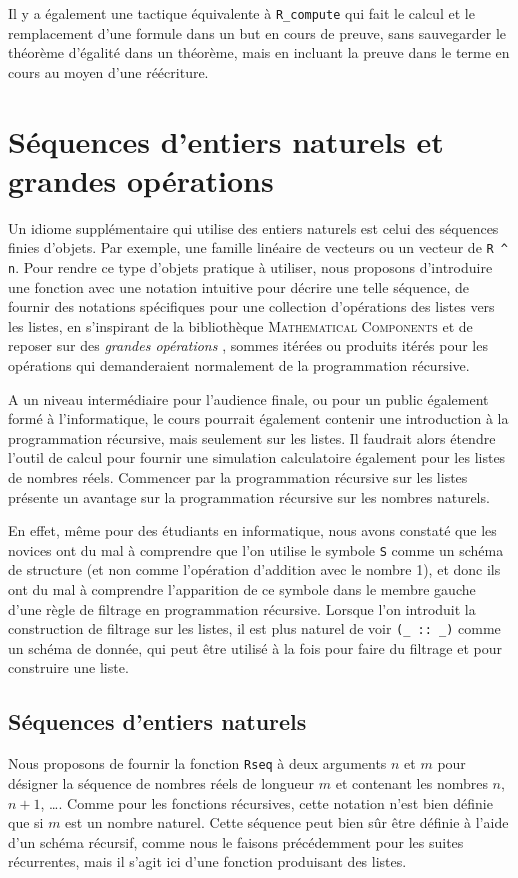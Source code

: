 \documentclass{jflart}
\newcommand{\mathcomp}{\textsc{Mathematical Components}}
\begin{document}
Il y a également une tactique équivalente à \texttt{R\_compute} qui fait
le calcul et le remplacement d'une formule dans un but en cours de
preuve, sans sauvegarder le théorème d'égalité dans un théorème, mais
en incluant la preuve dans le terme en cours au moyen d'une réécriture.

\section{Séquences d'entiers naturels et grandes opérations}
Un idiome supplémentaire qui utilise des entiers naturels est celui
des séquences finies d'objets.  Par exemple, une famille linéaire de
vecteurs ou un vecteur de \texttt{R \^{ } n}.  Pour rendre ce type d'objets
pratique à utiliser, nous proposons d'introduire une fonction avec
une notation intuitive pour décrire une telle séquence, de fournir
des notations spécifiques pour une collection d'opérations des listes
vers les listes, en s'inspirant de la bibliothèque \mathcomp{}
\cite{MahboubiTassi2022} et
de reposer sur des {\em grandes opérations} \cite{BGOBP:BIG08}, sommes
itérées ou
produits itérés pour les opérations qui demanderaient normalement de
la programmation récursive.

A un niveau intermédiaire pour l'audience finale, ou pour un public
également formé à l'informatique, le cours pourrait également contenir
une introduction à la programmation récursive, mais seulement sur les
listes.  Il faudrait alors étendre l'outil de calcul pour fournir une
simulation calculatoire également pour les listes de nombres réels.
Commencer par la programmation récursive sur les listes présente un
avantage sur la programmation récursive sur les nombres naturels.

En effet,
même pour des étudiants en informatique, nous avons constaté que les novices
ont du mal à comprendre que l'on utilise le symbole \texttt{S} comme un
schéma de structure (et non comme l'opération d'addition avec le nombre 1), et
donc ils ont du mal à comprendre l'apparition de ce symbole dans le membre
gauche d'une règle de filtrage en programmation récursive.  Lorsque l'on
introduit la construction de filtrage sur les listes, il est plus naturel
de voir \texttt{(\_ :: \_)} comme un schéma de donnée, qui peut être utilisé
à la fois pour faire du filtrage et pour construire une liste.

\subsection{Séquences d'entiers naturels}
Nous proposons de fournir la fonction \texttt{Rseq} à deux arguments
\(n\) et \(m\)
pour désigner la séquence de nombres réels de longueur \(m\) et
contenant les nombres \(n\), \(n + 1\), \dots.
Comme pour les fonctions récursives, cette notation
n'est bien définie que si \(m\) est un nombre naturel.  Cette séquence
peut bien sûr être définie à l'aide d'un schéma récursif, comme nous le
faisons précédemment pour les suites récurrentes, mais il s'agit ici
d'une fonction produisant des listes.
\end{document}
